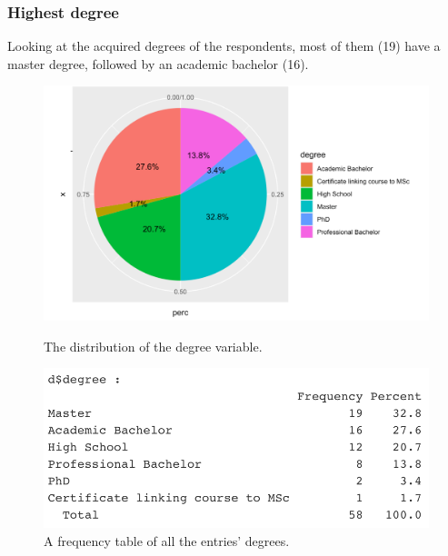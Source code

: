 \subsubsection{Highest degree}
Looking at the acquired degrees of the respondents, most of them (19) have a master degree, followed by an academic bachelor (16).
\begin{figure}[!htb]
	\includegraphics[width=\linewidth]{../LaTeX/Figures/Environments/DegreePlot.png}
	\caption{The distribution of the degree variable.}\label{fig:degreePlot}
	\endminipage\hfill
	\includegraphics[width=\linewidth]{../LaTeX/Figures/Environments/DegreeFreq.png}
	\caption{A frequency table of all the entries' degrees.}\label{fig:degreeFreq}
	\endminipage\hfill
\end{figure}


